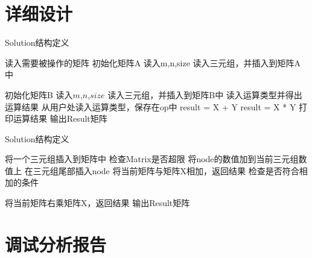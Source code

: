 \section{详细设计}
\begin{algorithm}[htb] 
   \caption{ Solution结构定义 } 
   \label{alg:Framwork} 
   \begin{algorithmic}[1]
      \State 读入需要被操作的矩阵
         \State 初始化矩阵A
         \State 读入m,n,size
            \State 读入三元组，并插入到矩阵A中
         \EndFor

         \State 初始化矩阵B
         \State 读入$m$,$n$,$size$
            \State 读入三元组，并插入到矩阵B中
         \EndFor
      \EndFunction
      \State 读入运算类型并得出运算结果
         \State 从用户处读入运算类型，保存在op中
            \State   result = X + Y
         \Else
            \State   result = X * Y
         \EndIf
      \EndFunction
      \State 打印运算结果
         \State 输出Result矩阵
      \EndFunction

   \end{algorithmic} 
\end{algorithm}



\begin{algorithm}[htb] 
   \caption{ Solution结构定义 } 
   \label{alg:Framwork} 
   \begin{algorithmic}[1]
      \State 将一个三元组插入到矩阵中
         \State 检查Matrix是否超限
               \State 将node的数值加到当前三元组数值上
            \EndIf
         \EndFor
            \State 在三元组尾部插入node
         \EndIf
      \EndFunction
      \State 将当前矩阵与矩阵X相加，返回结果
         \State 检查是否符合相加的条件
         
      \EndFunction
      \State 将当前矩阵右乘矩阵X，返回结果
         \State 输出Result矩阵
      \EndFunction

   \end{algorithmic} 
\end{algorithm}

\section{调试分析报告}

